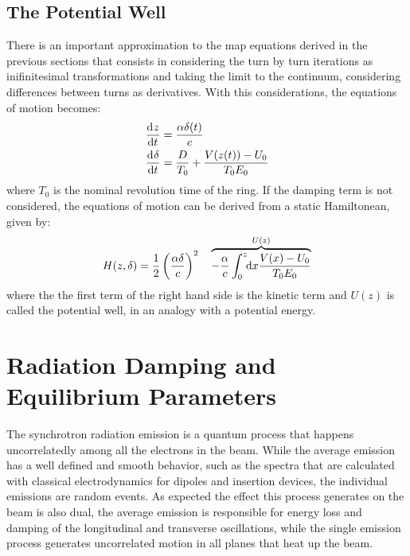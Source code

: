 \documentclass[
	12pt,				%
	openright,			%
	oneside,			%
	a4paper,		%
	chapter=TITLE,		%
	section=TITLE,		%
    brazil,				%
	english,			%
	sumario=tradicional,
	]{abntex2}
\begin{document}
    \subsection{The Potential Well}

	There is an important approximation to the map equations derived in the previous sections that consists in considering the turn by turn iterations as inifinitesimal transformations and taking the limit to the continuum, considering differences between turns as derivatives. With this considerations, the equations of motion becomes:
	\begin{align}
		\dertot{z}{t} &= \frac{\alpha \delta(t)}{c} \\\nonumber
		\dertot{\delta}{t} &= \frac{D}{T_0} + \frac{V(z(t))-U_0}{T_0E_0}
	\end{align}
	where $T_0$ is the nominal revolution time of the ring. If the damping term is not considered, the equations of motion can be derived from a static Hamiltonean, given by:
	\begin{align}
		H(z, \delta) = \frac12\left(\frac{\alpha\delta}{c}\right)^2 \quad \overbrace{- \frac{\alpha}{c}\defint{x}{\frac{V(x)-U_0}{T_0E_0}}{0}{z}}^{U(z)}
	\end{align}
	where the the first term of the right hand side is the kinetic term and $U(z)$ is called the potential well, in an analogy with a potential energy.

  \section{Radiation Damping and Equilibrium Parameters}

  The synchrotron radiation emission is a quantum process that happens uncorrelatedly among all the electrons in the beam. While the average emission has a well defined and smooth behavior, such as the spectra that are calculated with classical electrodynamics for dipoles and insertion devices, the individual emissions are random events. As expected the effect this process generates on the beam is also dual, the average emission is responsible for energy loss and damping of the longitudinal and transverse oscillations, while the single emission process generates uncorrelated motion in all planes that heat up the beam.
\end{document}
